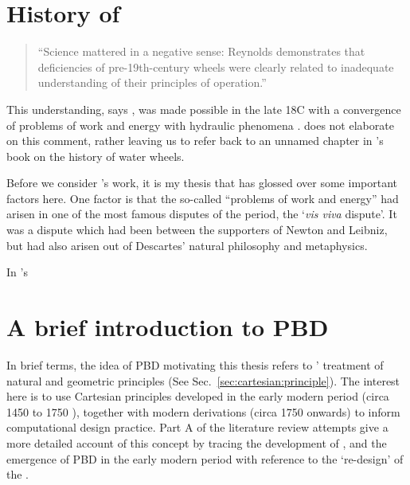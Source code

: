 \documentclass[a4paper, 12pt]{article}
\begin{document}
\section{History of \SE}
\label{sec:history:of}

\begin{quotation}
    ``Science mattered in a negative sense: Reynolds demonstrates that deficiencies of pre-19th-century wheels were clearly related to inadequate understanding of their principles of operation.'' \citep[p.827]{constant_review_1985}
\end{quotation}

This understanding, says \citeauthor{constant_review_1985}, was made possible in the late 18C with a convergence of problems of work and energy with hydraulic phenomena \citeyearpar[p.827]{constant_review_1985}. \citeauthor{constant_review_1985} does not elaborate on this comment, rather leaving us to refer back to an unnamed chapter in \citeauthor{reynolds_stronger_2002}'s book on the history of water wheels. 

Before we consider \citeauthor{reynolds_stronger_2002}'s work, it is my thesis that \citeauthor{constant_review_1985} has glossed over some important factors here. One factor is that the so-called ``problems of work and energy'' had arisen in one of the most famous disputes of the period, the `\textit{vis viva} dispute'. It was a dispute which had been between the supporters of Newton and Leibniz, but had also arisen out of Descartes'  natural philosophy and metaphysics.  

In \citeauthor{reynolds_stronger_2002}'s





\section{A brief introduction to PBD} 
\label{sec:what:pbd}

In brief terms, the idea of PBD motivating this thesis refers to \citeauthor{descartes_principles_1982}' treatment of natural and geometric principles (See Sec.~\ref{sec:cartesian:principle}). The interest here is to use Cartesian principles  developed in the early modern period (circa 1450 \CEs to 1750 \CE), together with modern derivations (circa 1750 \CEs onwards) to inform computational design practice. Part A of the literature review attempts give a more detailed account of this concept by tracing the development of \SEs, and the emergence of PBD in the early modern period with reference to the `re-design' of the \SEs. 
\end{document}

